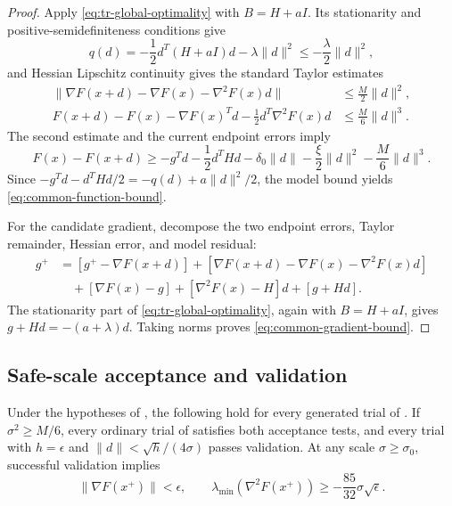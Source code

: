 \documentclass{article}
\begin{document}
\begin{proof}
Apply \eqref{eq:tr-global-optimality} with $B=H+aI$.  Its stationarity
and positive-semidefiniteness conditions give
\[
 q(d)=-\frac12d^T(H+aI)d-\lambda\|d\|^2
 \le-\frac{\lambda}{2}\|d\|^2,
\]
and Hessian Lipschitz continuity gives the standard Taylor estimates
\citep[Lemma~1.2.4]{nesterov2004introductory}
\[
\begin{aligned}
 \|\nabla F(x+d)-\nabla F(x)-\nabla^2F(x)d\|
 &\le\frac M2\|d\|^2,\\
 F(x+d)-F(x)-\nabla F(x)^Td-\frac12d^T\nabla^2F(x)d
 &\le\frac M6\|d\|^3.
\end{aligned}
\]
The second estimate and the current endpoint errors imply
\[
 F(x)-F(x+d)
 \ge-g^Td-\frac12d^THd-\delta_0\|d\|
      -\frac{\xi}{2}\|d\|^2-\frac M6\|d\|^3.
\]
Since
$-g^Td-d^THd/2=-q(d)+a\|d\|^2/2$, the model bound yields
\eqref{eq:common-function-bound}.

For the candidate gradient, decompose the two endpoint errors, Taylor
remainder, Hessian error, and model residual:
\begin{align*}
g^+
&=[g^+-\nabla F(x+d)]
 +[\nabla F(x+d)-\nabla F(x)-\nabla^2F(x)d]\\
&\quad+[\nabla F(x)-g]
 +[\nabla^2F(x)-H]d+[g+Hd].
\end{align*}
The stationarity part of \eqref{eq:tr-global-optimality}, again with
$B=H+aI$, gives $g+Hd=-(a+\lambda)d$.  Taking norms proves
\eqref{eq:common-gradient-bound}.
\end{proof}


\subsection{Safe-scale acceptance and validation}

\begin{lemma}
\label{lem:utr-safe}
Under the hypotheses of , the following hold
for every generated trial of .
If $\sigma^2\ge M/6$, every ordinary trial of
 satisfies both acceptance tests, and
every trial with $h=\epsilon$ and $\|d\|<\sqrt h/(4\sigma)$
passes validation.
At any scale $\sigma\ge\sigma_0$, successful validation implies
\begin{equation}\label{eq:utr-validator-return}
 \|\nabla F(x^+)\|<\epsilon,
 \qquad
 \lambda_{\min}(\nabla^2F(x^+))
 \ge-\frac{85}{32}\sigma\sqrt\epsilon.
\end{equation}
\end{lemma}
\end{document}
